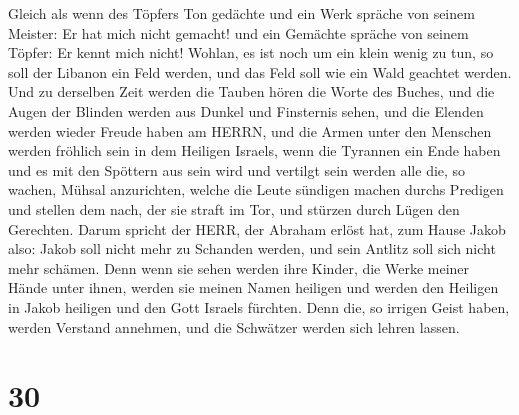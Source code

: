 Gleich als wenn des Töpfers Ton gedächte und ein Werk spräche von seinem
Meister: Er hat mich nicht gemacht! und ein Gemächte spräche von seinem
Töpfer: Er kennt mich nicht!  Wohlan, es ist noch um ein
klein wenig zu tun, so soll der Libanon ein Feld werden, und das Feld
soll wie ein Wald geachtet werden.  Und zu derselben Zeit
werden die Tauben hören die Worte des Buches, und die Augen der Blinden
werden aus Dunkel und Finsternis sehen,  und die Elenden
werden wieder Freude haben am HERRN, und die Armen unter den Menschen
werden fröhlich sein in dem Heiligen Israels,  wenn die
Tyrannen ein Ende haben und es mit den Spöttern aus sein wird und
vertilgt sein werden alle die, so wachen, Mühsal anzurichten,
 welche die Leute sündigen machen durchs Predigen und
stellen dem nach, der sie straft im Tor, und stürzen durch Lügen den
Gerechten.  Darum spricht der HERR, der Abraham erlöst hat,
zum Hause Jakob also: Jakob soll nicht mehr zu Schanden werden, und sein
Antlitz soll sich nicht mehr schämen.  Denn wenn sie sehen
werden ihre Kinder, die Werke meiner Hände unter ihnen, werden sie
meinen Namen heiligen und werden den Heiligen in Jakob heiligen und den
Gott Israels fürchten.  Denn die, so irrigen Geist haben,
werden Verstand annehmen, und die Schwätzer werden sich lehren lassen.

\hypertarget{section-29}{%
\section{30}\label{section-29}}

